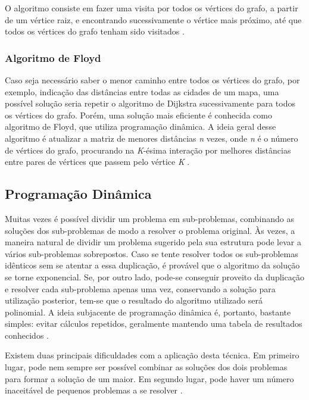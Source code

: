 O algoritmo consiste em fazer uma visita por todos os vértices do grafo, a partir de um vértice raiz, e encontrando sucessivamente o vértice mais próximo, até que todos os vértices do grafo tenham sido visitados \cite{Cormen:2001}.

\subsubsection{Algoritmo de Floyd}

Caso seja necessário saber o menor caminho entre todos os vértices do grafo, por exemplo, indicação das distâncias entre todas as cidades de um mapa, uma possível solução seria repetir o algoritmo de Dijkstra sucessivamente para todos os vértices do grafo. Porém, uma solução mais eficiente é conhecida como algoritmo de Floyd, que utiliza programação dinâmica. A ideia geral desse algoritmo é atualizar a matriz de menores distâncias \textit{n} vezes, onde \textit{n} é o número de vértices do grafo, procurando na \textit{K}-ésima interação por melhores distâncias entre pares de vértices que passem pelo vértice \textit{K} \cite{Sampaio:2005}.

\subsection{Programação Dinâmica}

Muitas vezes é possível dividir um problema em sub-problemas, combinando as soluções dos sub-problemas de modo a resolver o problema original. Às vezes, a maneira natural de dividir um problema sugerido pela sua estrutura pode levar a vários sub-problemas sobrepostos. Caso se tente resolver todos os sub-problemas idênticos sem se atentar a essa duplicação, é provável que o algoritmo da solução se torne exponencial. Se, por outro lado, pode-se conseguir proveito da duplicação e resolver cada sub-problema apenas uma vez, conservando a solução para utilização posterior, tem-se que o resultado do algoritmo utilizado será polinomial. A ideia subjacente de programação dinâmica é, portanto, bastante simples: evitar cálculos repetidos, geralmente mantendo uma tabela de resultados conhecidos \cite{Aho:1983}.

Existem duas principais dificuldades com a aplicação desta técnica. Em primeiro lugar, pode nem sempre ser possível combinar as soluções dos dois problemas para formar a solução de um maior. Em segundo lugar, pode haver um número inaceitável de pequenos problemas a se resolver \cite{Sedgewick:2011}.

